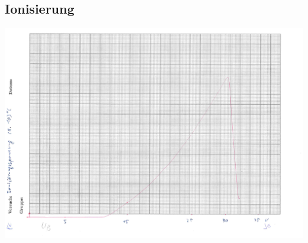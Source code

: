 \subsection{Ionisierung}
\begin{landscape}
\includegraphics[page = 1, scale = 0.5]{8c.pdf}
\label{fig:8c}
\end{landscape}
